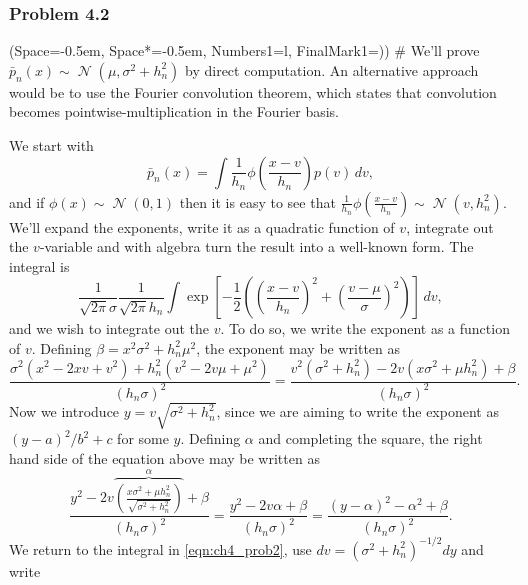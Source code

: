\documentclass[12pt, a4paper]{article}
\newcommand{\listSpace}{-0.5em}%
\DeclareMathOperator{\N}{\mathcal{N}}
\begin{document}
\subsubsection*{Problem 4.2}
\begin{easylist}[enumerate]
	\ListProperties(Space=\listSpace, Space*=\listSpace, Numbers1=l, FinalMark1={)})
	# We'll prove $\bar{p}_n(x) \sim \N(\mu, \sigma^2 + h_n^2)$ by direct computation. 
	An alternative approach would be to use the Fourier convolution theorem, which states that convolution becomes pointwise-multiplication in the Fourier basis.
	
	We start with
	\begin{equation*}
	\bar{p}_n(x) = 	\int \frac{1}{h_n} \phi \left( \frac{x-v}{h_n} \right) p(v) \, dv,
	\end{equation*}
	and if $\phi(x) \sim \N(0, 1)$ then it is easy to see that $\frac{1}{h_n} \phi \left( \frac{x-v}{h_n} \right) \sim \N(v, h_n^2)$.
	We'll expand the exponents, write it as a quadratic function of $v$, integrate out the $v$-variable and with algebra turn the result into a well-known form.
	The integral is
	\begin{equation}
	\label{eqn:ch4_prob2}
		\frac{1}{\sqrt{2 \pi} \sigma}
		\frac{1}{\sqrt{2 \pi} h_n}
		 \int \exp \left[ -\frac{1}{2} \left( 
		 \left(\frac{x-v}{h_n}\right)^2 + 
		 \left(\frac{v - \mu}{\sigma}\right)^2 
		 \right)\right] \, dv,
	\end{equation}
	and we wish to integrate out the $v$.
	To do so, we write the exponent as a function of $v$.
	Defining $\beta = x^2 \sigma^2 + h_n^2 \mu^2$, the exponent may be written as
	\begin{equation*}
		\frac{\sigma^2 \left( x^2 - 2xv + v^2 \right) + 
			h_n^2 \left( v^2 - 2v\mu + \mu^2 \right)}{(h_n \sigma)^2} = 
		\frac{v^2(\sigma^2 + h_n^2) - 2v (x\sigma^2 + \mu h_n^2) + \beta}{(h_n \sigma)^2}.
	\end{equation*}
	Now we introduce $y = v \sqrt{\sigma^2 + h_n^2}$, since we are aiming to write the exponent as $(y - a)^2 / b^2 + c$ for some $y$.
	Defining $\alpha$ and completing the square, the right hand side of the equation above may be written as
	\begin{equation*}
		\frac{y^2 - 2v  \overbrace{ \left(\frac{x \sigma^2 + \mu h_n^2}{\sqrt{\sigma^2 + h_n^2}} \right)}^\alpha  + \beta}{(h_n \sigma)^2}
		=
		\frac{y^2 - 2v \alpha + \beta}{(h_n \sigma)^2}
		=
		\frac{(y - \alpha)^2 - \alpha^2 + \beta}{(h_n \sigma)^2}.
	\end{equation*}
	We return to the integral in \eqref{eqn:ch4_prob2}, use $dv = (\sigma^2 + h_n^2)^{-1/2} dy$ and write 

\end{easylist}
\end{document}
